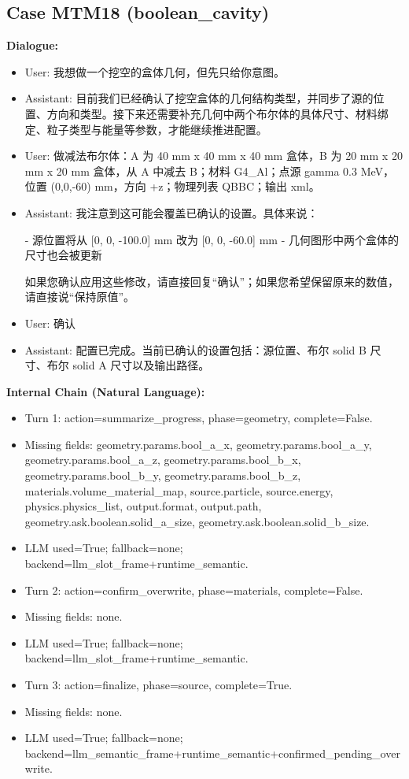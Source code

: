 \documentclass[11pt]{ctexart}
\begin{document}
\subsection{Case MTM18 (boolean\_cavity)}
\textbf{Dialogue:}
\begin{itemize}
\item User: 我想做一个挖空的盒体几何，但先只给你意图。
\item Assistant: 目前我们已经确认了挖空盒体的几何结构类型，并同步了源的位置、方向和类型。接下来还需要补充几何中两个布尔体的具体尺寸、材料绑定、粒子类型与能量等参数，才能继续推进配置。
\item User: 做减法布尔体：A 为 40 mm x 40 mm x 40 mm 盒体，B 为 20 mm x 20 mm x 20 mm 盒体，从 A 中减去 B；材料 G4\_Al；点源 gamma 0.3 MeV，位置 (0,0,-60) mm，方向 +z；物理列表 QBBC；输出 xml。
\item Assistant: 我注意到这可能会覆盖已确认的设置。具体来说：

- 源位置将从 [0, 0, -100.0] mm 改为 [0, 0, -60.0] mm
- 几何图形中两个盒体的尺寸也会被更新

如果您确认应用这些修改，请直接回复“确认”；如果您希望保留原来的数值，请直接说“保持原值”。
\item User: 确认
\item Assistant: 配置已完成。当前已确认的设置包括：源位置、布尔 solid B 尺寸、布尔 solid A 尺寸以及输出路径。
\end{itemize}
\textbf{Internal Chain (Natural Language):}
\begin{itemize}
\item Turn 1: action=summarize\_progress, phase=geometry, complete=False.
\item Missing fields: geometry.params.bool\_a\_x, geometry.params.bool\_a\_y, geometry.params.bool\_a\_z, geometry.params.bool\_b\_x, geometry.params.bool\_b\_y, geometry.params.bool\_b\_z, materials.volume\_material\_map, source.particle, source.energy, physics.physics\_list, output.format, output.path, geometry.ask.boolean.solid\_a\_size, geometry.ask.boolean.solid\_b\_size.
\item LLM used=True; fallback=none; backend=llm\_slot\_frame+runtime\_semantic.
\item Turn 2: action=confirm\_overwrite, phase=materials, complete=False.
\item Missing fields: none.
\item LLM used=True; fallback=none; backend=llm\_slot\_frame+runtime\_semantic.
\item Turn 3: action=finalize, phase=source, complete=True.
\item Missing fields: none.
\item LLM used=True; fallback=none; backend=llm\_semantic\_frame+runtime\_semantic+confirmed\_pending\_overwrite.
\end{itemize}
\end{document}
